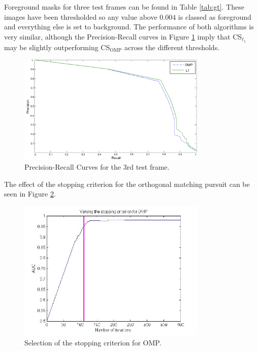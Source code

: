 
Foreground masks for three test frames can be found in Table \ref{tab:gt}. These images have been thresholded so any value above $0.004$ is classed as foreground and everything else is set to background. The performance of both algorithms is very similar, although the Precision-Recall curves in Figure \ref{fig:precrec} imply that CS$_{\ell_1}$ may be slightly outperforming CS$_{\text{OMP}}$ across the different thresholds. 

\begin{figure}[H]
  \centering
  \includegraphics[width = 9cm]{Epr_EDIT}
  \caption{Precision-Recall Curves for the 3rd test frame.}
  \label{fig:precrec}
\end{figure}

The effect of the stopping criterion for the orthogonal matching pursuit can be seen in Figure \ref{fig:omp}.

\begin{figure}[H]
  \centering
  \includegraphics[width = 9cm]{varyingSComp}
  \caption{Selection of the stopping criterion for OMP.}
  \label{fig:omp}
\end{figure}


